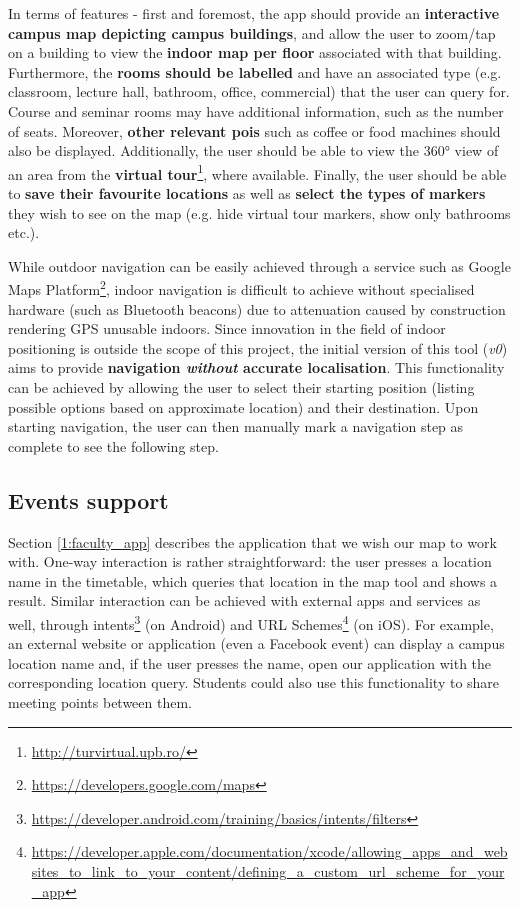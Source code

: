         In terms of features - first and foremost, the app should provide an \textbf{interactive campus map depicting campus buildings}, and allow the user to zoom/tap on a building to view the \textbf{indoor map per floor} associated with that building. Furthermore, the \textbf{rooms should be labelled} and have an associated type (e.g. classroom, lecture hall, bathroom, office, commercial) that the user can query for. Course and seminar rooms may have additional information, such as the number of seats. Moreover, \textbf{other relevant \acrshort{poi}s} such as coffee or food machines should also be displayed. Additionally, the user should be able to view the 360° view of an area from the \textbf{virtual tour}\footnote{\url{http://turvirtual.upb.ro/}}, where available. Finally, the user should be able to \textbf{save their favourite locations} as well as \textbf{select the types of markers} they wish to see on the map (e.g. hide virtual tour markers, show only bathrooms etc.).
        
        While outdoor navigation can be easily achieved through a service such as Google Maps Platform\footnote{\url{https://developers.google.com/maps}}, indoor navigation is difficult to achieve without specialised hardware (such as Bluetooth beacons) due to attenuation caused by construction rendering GPS unusable indoors. Since innovation in the field of indoor positioning is outside the scope of this project, the initial version of this tool (\textit{v0}) aims to provide \textbf{navigation \textit{without} accurate localisation}. This functionality can be achieved by allowing the user to select their starting position (listing possible options based on approximate location) and their destination. Upon starting navigation, the user can then manually mark a navigation step as complete to see the following step.
        
    \subsection{Events support} \label{1:functionalities_events}
    
        Section \ref{1:faculty_app} describes the application that we wish our map to work with. One-way interaction is rather straightforward: the user presses a location name in the timetable, which queries that location in the map tool and shows a result. Similar interaction can be achieved with external apps and services as well, through intents\footnote{\url{https://developer.android.com/training/basics/intents/filters}} (on Android) and URL Schemes\footnote{\url{https://developer.apple.com/documentation/xcode/allowing_apps_and_websites_to_link_to_your_content/defining_a_custom_url_scheme_for_your_app}} (on iOS). For example, an external website or application (even a Facebook event) can display a campus location name and, if the user presses the name, open our application with the corresponding location query. Students could also use this functionality to share meeting points between them.
        
